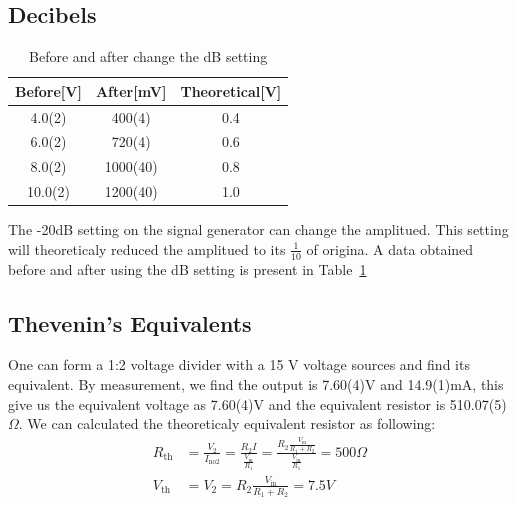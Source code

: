 \documentclass[aps,prl,reprint]{revtex4-1}
\begin{document}
    \subsection{Decibels}
    \begin{table}[h]
    \begin{ruledtabular}
    \begin{tabular}{ccc} 
    Before[V] & After[mV] & Theoretical[V] \\ \hline\hline
    4.0(2)    & 400(4)    & 0.4            \\ \hline
    6.0(2)    & 720(4)    & 0.6            \\ \hline
    8.0(2)    & 1000(40)  & 0.8            \\ \hline
    10.0(2)   & 1200(40)  & 1.0              \\
    \end{tabular}
    \end{ruledtabular}
    \caption{Before and after change the dB setting}
    \label{table:7}
    \end{table} 
    The -20dB setting on the signal generator can change the amplitued. This setting will theoreticaly reduced the amplitued to its $\frac{1}{10}$ of origina. A data obtained before and after using the dB setting is present in Table~\ref{table:7}

    \subsection{Thevenin's Equivalents}
    One can form a 1:2 voltage divider with a 15 V voltage sources and find its equivalent. By measurement, we find the output is 7.60(4)V and 14.9(1)mA, this give us the equivalent voltage as 7.60(4)V and the equivalent resistor is 510.07(5)$\Omega$. We can calculated the theoreticaly equivalent resistor as following:
    \begin{align*}
        R_\text{th} &= \frac{V_2}{I_\text{no2}} = \frac{R_2I}{\frac{V_\text{in}}{R_1}} = \frac{R_2 \frac{V_\text{in}}{R_1 + R_2}}{\frac{V_\text{in}}{R_1}} = 500\Omega \\
        V_\text{th} &= V_2 = R_2 \frac{V_\text{in}}{R_1 + R_2} = 7.5V
    \end{align*}
\end{document}
